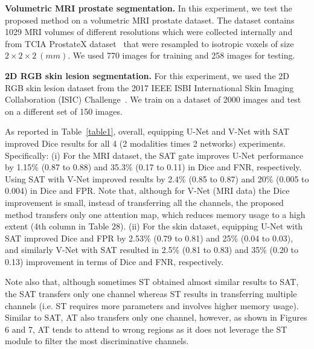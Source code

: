 \documentclass{article}
\begin{document}
\noindent \textbf{Volumetric MRI prostate segmentation.} In this experiment, we test the proposed method on a volumetric MRI prostate dataset. The dataset contains 1029 MRI volumes of different resolutions which were collected internally and from TCIA ProstateX dataset~\cite{ProstateX2017,litjens2014computer,clark2013cancer} that were resampled to isotropic voxels of size $2\times2\times2 \ (mm)$. We used 770 images for training and 258 images for testing. 

\noindent \textbf{2D RGB skin lesion segmentation.} For this experiment, we used the 2D RGB skin lesion dataset from the 2017 IEEE ISBI International Skin Imaging Collaboration (ISIC) Challenge~\cite{codella2017skin}. We train on a dataset of 2000 images and test on a different set of 150 images.

As reported in Table~\ref{table1}, overall, equipping U-Net and V-Net with SAT improved Dice results for all  4 (2 modalities times 2 networks) experiments. Specifically: (i) For the MRI dataset, the SAT gate improves U-Net performance by 1.15\% (0.87 to 0.88) and 35.3\% (0.17 to 0.11) in Dice and FNR, respectively. Using SAT with V-Net improved results by 2.4\% (0.85 to 0.87) and 20\% (0.005 to 0.004) in Dice and FPR. Note that, although for V-Net (MRI data) the Dice improvement is small, instead of transferring all the channels, the proposed method transfers only one attention map, which reduces memory usage to a high extent (4th column in Table 28). (ii) For the skin dataset, equipping U-Net with SAT improved Dice and FPR by 2.53\% (0.79 to 0.81) and 25\% (0.04 to 0.03), and similarly V-Net with SAT resulted in 2.5\% (0.81 to 0.83) and 35\% (0.20 to 0.13) improvement in terms of Dice and FNR, respectively.

Note also that, although sometimes ST obtained almost similar results to SAT, the SAT transfers only one channel whereas ST results in transferring multiple channels (i.e. ST requires more parameters and involves higher memory usage). Similar to SAT, AT also transfers only one channel, however, as shown in Figures 6 and 7, AT tends to attend to wrong regions as it does not leverage the ST module to filter the most discriminative channels.
\end{document}
